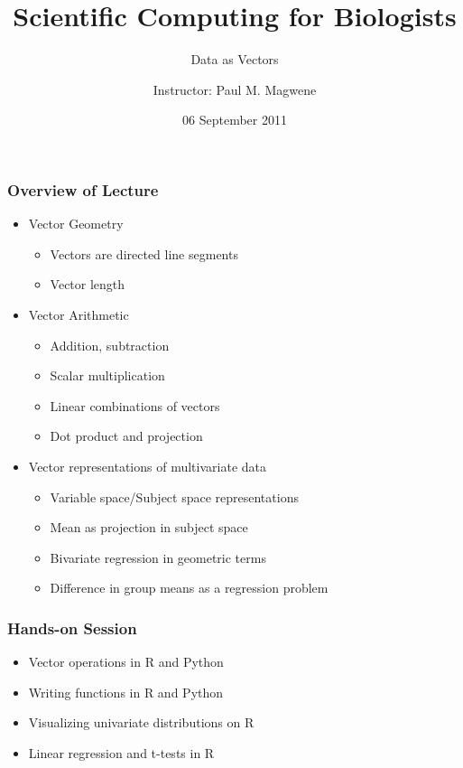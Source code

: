 \documentclass{beamer}
\title{Scientific Computing for Biologists}
\subtitle{Data as Vectors} %
\author[P. Magwene]{Instructor: Paul M. Magwene}
\date{06 September 2011}
\begin{document}
\begin{frame}
\titlepage
\end{frame}

\begin{frame}
  \frametitle{Overview of Lecture}
  
\begin{itemize}
		\item Vector Geometry
		\begin{itemize}
			\item Vectors are directed line segments
			\item Vector length
		\end{itemize}
		\item Vector Arithmetic
		\begin{itemize}
			\item Addition, subtraction
			\item Scalar multiplication
			\item Linear combinations of vectors
			\item Dot product and projection
		\end{itemize}
		\item Vector representations of multivariate data
		\begin{itemize}
		  \item Variable space/Subject space representations	 
			\item Mean as projection in subject space
			\item Bivariate regression in geometric terms
			\item Difference in group means as a regression problem
		\end{itemize}
\end{itemize}

\end{frame}

\begin{frame}
  \frametitle{Hands-on Session}
		\begin{itemize}
		  \item Vector operations in R and Python
		  \item Writing functions in R and Python
		  \item Visualizing univariate distributions on R
		  \item Linear regression and t-tests in R
	 \end{itemize}
\end{frame}		
\end{document}
